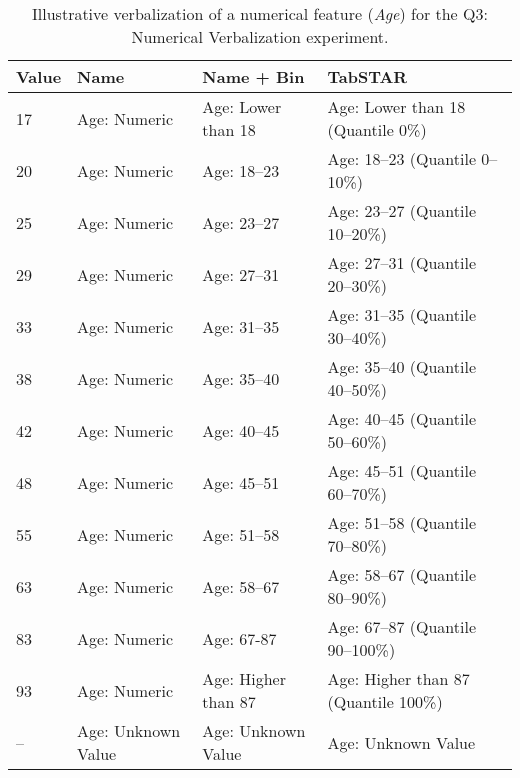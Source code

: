 \begin{table}[h]
\centering
\caption{Illustrative verbalization of a numerical feature (\textit{Age}) for the Q3: Numerical Verbalization experiment.}
\begin{tabular}{llll}
\toprule
\textbf{Value} & \textbf{Name}      & \textbf{Name + Bin}     & \textbf{TabSTAR}          \\
\midrule
17             & Age: Numeric       & Age: Lower than 18      & Age: Lower than 18 (Quantile 0\%)        \\
20             & Age: Numeric       & Age: 18–23              & Age: 18–23 (Quantile 0–10\%)                \\
25             & Age: Numeric       & Age: 23–27              & Age: 23–27 (Quantile 10–20\%)               \\
29             & Age: Numeric       & Age: 27–31              & Age: 27–31 (Quantile 20–30\%)               \\
33             & Age: Numeric       & Age: 31–35              & Age: 31–35 (Quantile 30–40\%)               \\
38             & Age: Numeric       & Age: 35–40              & Age: 35–40 (Quantile 40–50\%)               \\
42             & Age: Numeric       & Age: 40–45              & Age: 40–45 (Quantile 50–60\%)               \\
48             & Age: Numeric       & Age: 45–51              & Age: 45–51 (Quantile 60–70\%)               \\
55             & Age: Numeric       & Age: 51–58              & Age: 51–58 (Quantile 70–80\%)               \\
63             & Age: Numeric       & Age: 58–67              & Age: 58–67 (Quantile 80–90\%)               \\

83             & Age: Numeric       & Age: 67-87     & Age: 67–87 (Quantile 90–100\%)     \\

93             & Age: Numeric       & Age: Higher than 87     & Age: Higher than 87 (Quantile 100\%)     \\
–              & Age: Unknown Value & Age: Unknown Value      & Age: Unknown Value                          \\
\bottomrule
\end{tabular}
\label{tab:analysis_numerical_example}
\end{table}



